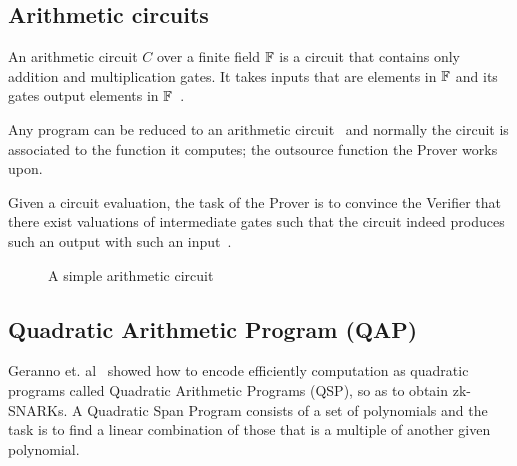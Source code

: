 \subsection{Arithmetic circuits}
\label{zkp:snarks:circuits}

An arithmetic circuit $C$ over a finite field $\mathbb{F}$ is a circuit that contains
only addition and multiplication gates. It takes inputs that are elements in $\mathbb{F}$ and its gates output elements in $\mathbb{F}$~\cite{184425, zcash}.

Any program  can be reduced to  an arithmetic circuit~\cite{pankova_succinct_2013, 10.1007/978-3-642-40084-1_6} and normally the circuit is associated to the function it computes; the outsource function the Prover works upon.

Given a circuit evaluation, the task of the Prover is to convince the Verifier that there exist valuations of intermediate gates such that the circuit indeed produces such an output with such an input~\cite{pankova_succinct_2013}.

\begin{figure}[ht!]
  \center
  \caption{A simple arithmetic circuit}
  \label{fig:zkp:circuit}
\end{figure}

\subsection{Quadratic Arithmetic Program (QAP)}
\label{zkp:snarks:qap}

Geranno et. al~\cite{ggpr} showed how to encode efficiently computation as quadratic programs called Quadratic Arithmetic Programs (QSP), so as to obtain zk-SNARKs. A Quadratic Span Program consists of a set of polynomials and the task is to find a linear combination of those that is a multiple of another given polynomial.

